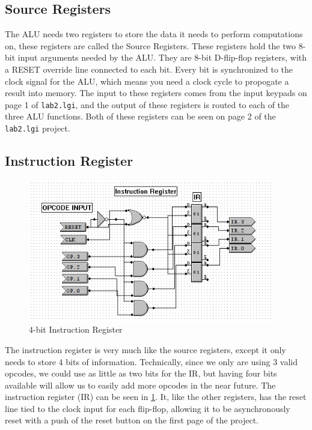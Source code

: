 \documentclass[a4paper,11pt]{article}
\begin{document}
\subsection{Source Registers}
 The ALU needs two registers to store the data it needs to perform computations on, these registers are called the Source Registers. These registers hold the two 8-bit input arguments needed by the ALU. They are 8-bit D-flip-flop registers, with a RESET override line connected to each bit. Every bit is synchronized to the clock signal for the ALU, which means you need a clock cycle to propogate a result into memory. The input to these registers comes from the input keypads on page 1 of \texttt{lab2.lgi}, and the output of these registers is routed to each of the three ALU functions. Both of these registers can be seen on page 2 of the \texttt{lab2.lgi} project.

\subsection{Instruction Register}

   \begin{figure}
       \includegraphics[width=4.2in]{pictures/instructionregister}
     \caption{4-bit Instruction Register}
     \label{fig:instructionregister}
  \end{figure} 

  The instruction register is very much like the source registers, except it only needs to store 4 bits of information. Technically, since we only are using 3 valid opcodes, we could use as little as two bits for the IR, but having four bits available will allow us to easily add more opcodes in the near future. The instruction register (IR) can be seen in \ref{fig:instructionregister}. It, like the other registers, has the reset line tied to the clock input for each flip-flop, allowing it to be asynchronously reset with a push of the reset button on the first page of the project. 
\end{document}
